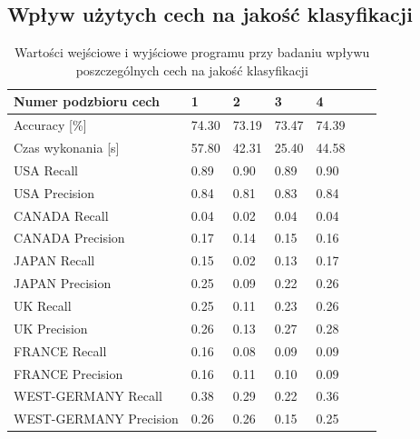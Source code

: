 \documentclass{classrep}
\begin{document}
{        \subsection{Wpływ użytych cech na jakość klasyfikacji} {

            \begin{table}[!htbp]
                \centering
                \begin{tabular}{|l|l|l|l|l|l|l|}
                    \hline
                    Numer podzbioru cech   & 1     & 2     & 3     & 4     \\ \hline
                    Accuracy {[}\%{]}      & 74.30 & 73.19 & 73.47 & 74.39 \\ \hline
                    Czas wykonania {[}s{]} & 57.80 & 42.31 & 25.40 & 44.58 \\ \hline
                    USA Recall             & 0.89  & 0.90  & 0.89  & 0.90  \\ \hline
                    USA Precision          & 0.84  & 0.81  & 0.83  & 0.84  \\ \hline
                    CANADA Recall          & 0.04  & 0.02  & 0.04  & 0.04  \\ \hline
                    CANADA Precision       & 0.17  & 0.14  & 0.15  & 0.16  \\ \hline
                    JAPAN Recall           & 0.15  & 0.02  & 0.13  & 0.17  \\ \hline
                    JAPAN Precision        & 0.25  & 0.09  & 0.22  & 0.26  \\ \hline
                    UK Recall              & 0.25  & 0.11  & 0.23  & 0.26  \\ \hline
                    UK Precision           & 0.26  & 0.13  & 0.27  & 0.28  \\ \hline
                    FRANCE Recall          & 0.16  & 0.08  & 0.09  & 0.09  \\ \hline
                    FRANCE Precision       & 0.16  & 0.11  & 0.10  & 0.09  \\ \hline
                    WEST-GERMANY Recall    & 0.38  & 0.29  & 0.22  & 0.36  \\ \hline
                    WEST-GERMANY Precision & 0.26  & 0.26  & 0.15  & 0.25  \\ \hline
                \end{tabular}
                \caption{Wartości wejściowe i wyjściowe programu przy badaniu wpływu poszczególnych cech na jakość klasyfikacji} \label{table-features1}
            \end{table}
            \FloatBarrier

}}
\end{document}
